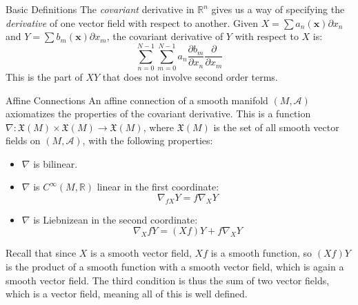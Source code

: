 \documentclass{beamer}
\begin{document}
    \begin{frame}{Basic Definitions}
        The \textit{covariant} derivative in $\mathbb{R}^{n}$ gives us a way
        of specifying the \textit{derivative} of one vector field with respect
        to another. Given $X=\sum{a}_{n}(\mathbf{x})\partial{x}_{n}$ and
        $Y=\sum{b}_{m}(\mathbf{x})\partial{x}_{m}$, the covariant derivative
        of $Y$ with respect to $X$ is:
        \begin{equation}
            \sum_{n=0}^{N-1}\sum_{m=0}^{N-1}a_{n}
                \frac{\partial{b}_{m}}{\partial{x}_{n}}
                \frac{\partial}{\partial{x}_{m}}
        \end{equation}
        This is the part of $XY$ that does not involve second order terms.
    \end{frame}
    \begin{frame}{Affine Connections}
        An affine connection of a smooth manifold $(M,\mathcal{A})$
        axiomatizes the properties of the covariant derivative. This is a
        function
        $\nabla:\mathfrak{X}(M)\times\mathfrak{X}(M)\rightarrow\mathfrak{X}(M)$,
        where $\mathfrak{X}(M)$ is the set of all smooth vector fields on
        $(M,\mathcal{A})$, with the following properties:
        \begin{itemize}
            \item $\nabla$ is bilinear.
            \item $\nabla$ is $C^{\infty}(M,\mathbb{R})$ linear in the first
                coordinate:
                \begin{equation}
                    \nabla_{fX}Y=f\nabla_{X}Y
                \end{equation}
            \item $\nabla$ is Liebnizean in the second coordinate:
                \begin{equation}
                    \nabla_{X}fY=(Xf)Y+f\nabla_{X}Y
                \end{equation}
        \end{itemize}
        Recall that since $X$ is a smooth vector field, $Xf$ is a smooth
        function, so $(Xf)Y$ is the product of a smooth function with a smooth
        vector field, which is again a smooth vector field. The third condition
        is thus the sum of two vector fields, which is a vector field, meaning
        all of this is well defined.
    \end{frame}
\end{document}
